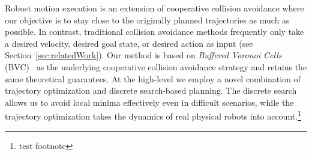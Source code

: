 \documentclass{svproc}
\begin{document}
Robust motion execution is an extension of cooperative collision avoidance where our objective is to stay close to the originally planned trajectories as much as possible.
In contrast, traditional collision avoidance methods frequently only take a desired velocity, desired goal state, or desired action as input (see Section~\ref{sec:relatedWork}).
Our method is based on \emph{Buffered Voronoi Cells} (BVC)~\cite{bufferedVoronoiCells} as the underlying cooperative collision avoidance strategy and retains the same theoretical guarantees.
At the high-level we employ a novel combination of trajectory optimization and discrete search-based planning.
The discrete search allows us to avoid local minima effectively even in difficult scenarios, while the trajectory optimization takes the dynamics of real physical robots into account.\footnote{test footnote}

\end{document}
